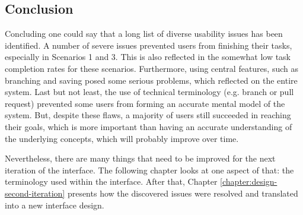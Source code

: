 


\subsection{Conclusion} \label{sec:summary-usability-problems}
Concluding one could say that a long list of diverse usability issues has been identified. A number of severe issues prevented users from finishing their tasks, especially in Scenarios 1 and 3. This is also reflected in the somewhat low task completion rates for these scenarios.
Furthermore, using central features, such as branching and saving posed some serious problems, which reflected on the entire system. Last but not least, the use of technical terminology (e.g. branch or pull request) prevented some users from forming an accurate mental model of the system. But, despite these flaws, a majority of users still succeeded in reaching their goals, which is more important than having an accurate understanding of the underlying concepts, which will probably improve over time.

Nevertheless, there are many things that need to be improved for the next iteration of the interface. The following chapter looks at one aspect of that: the terminology used within the interface. After that, Chapter \ref{chapter:design-second-iteration} presents how the discovered issues were resolved and translated into a new interface design.



